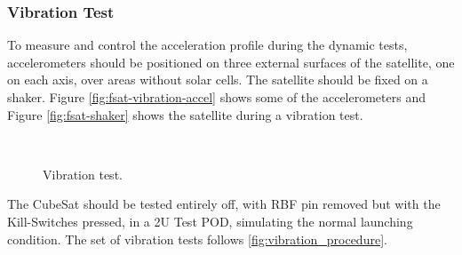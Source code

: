 \subsubsection{Vibration Test}

To measure and control the acceleration profile during the dynamic tests, accelerometers should be positioned on three external surfaces of the satellite, one on each axis, over areas without solar cells. The satellite should be fixed on a shaker. Figure \ref{fig:fsat-vibration-accel} shows some of the accelerometers and Figure \ref{fig:fsat-shaker} shows the satellite during a vibration test.

\begin{figure}[!htb]
    \begin{center}
        ~
        \caption{Vibration test.}
        \label{fig:vibration-test}
    \end{center}
\end{figure}

The CubeSat should be tested entirely off, with RBF pin removed but with the Kill-Switches pressed, in a 2U Test POD, simulating the normal launching condition. The set of vibration tests follows \autoref{fig:vibration_procedure}.


